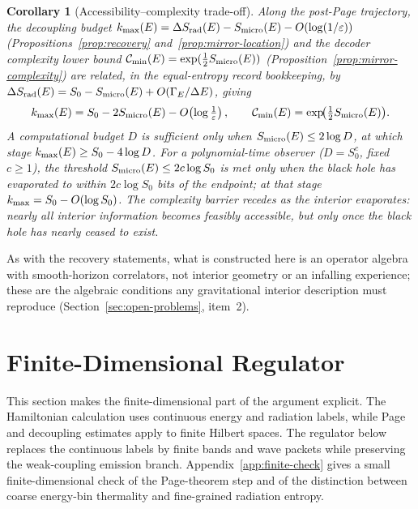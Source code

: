 \documentclass[12pt]{article}
\newcommand{\Smicro}{S_{\rm micro}}
\newtheorem{corollary}{Corollary}
\begin{document}
\begin{corollary}[Accessibility--complexity trade-off]
\label{cor:accessibility-complexity}
Along the post-Page trajectory, the decoupling budget
$k_{\rm max}(E)=\Delta S_{\rm rad}(E)-\Smicro(E)-O(\log(1/\varepsilon))$
(Propositions~\ref{prop:recovery} and~\ref{prop:mirror-location})
and the decoder complexity lower bound
$\mathcal C_{\rm min}(E)=\exp(\frac{1}{2}\Smicro(E))$
(Proposition~\ref{prop:mirror-complexity})
are related, in the equal-entropy record bookkeeping, by
$\Delta S_{\rm rad}(E)=S_0-\Smicro(E)+O(\Gamma_E/\Delta E)$, giving
\begin{equation}
\label{eq:accessibility-complexity}
  k_{\rm max}(E) = S_0 - 2\Smicro(E) - O\!\left(\log\tfrac{1}{\varepsilon}\right),
  \qquad
  \mathcal C_{\rm min}(E) = \exp\!\bigl(\tfrac{1}{2}\Smicro(E)\bigr).
\end{equation}
A computational budget $D$ is sufficient only when $\Smicro(E)\le 2\log D$,
at which stage $k_{\rm max}(E)\ge S_0-4\log D$.
For a polynomial-time observer ($D=S_0^c$, fixed $c\ge1$), the threshold
$\Smicro(E)\le 2c\log S_0$ is met only when the black hole has evaporated
to within $2c\log S_0$ bits of the endpoint; at that stage
$k_{\rm max}=S_0-O(\log S_0)$.
The complexity barrier recedes as the interior evaporates: nearly all
interior information becomes feasibly accessible, but only once the black
hole has nearly ceased to exist.
\end{corollary}

As with the recovery statements, what is constructed here is an operator
algebra with smooth-horizon correlators, not interior geometry or an
infalling experience; these are the algebraic conditions any gravitational
interior description must reproduce
(Section~\ref{sec:open-problems}, item~2).

\section{Finite-Dimensional Regulator}

This section makes the finite-dimensional part of the argument explicit.  The
Hamiltonian calculation uses continuous energy and radiation labels, while
Page and decoupling estimates apply to finite Hilbert spaces.  The regulator
below replaces the continuous labels by finite bands and wave packets while
preserving the weak-coupling emission branch.  Appendix~\ref{app:finite-check}
gives a small finite-dimensional check of the Page-theorem step and of the
distinction between coarse energy-bin thermality and fine-grained radiation
entropy.
\end{document}
